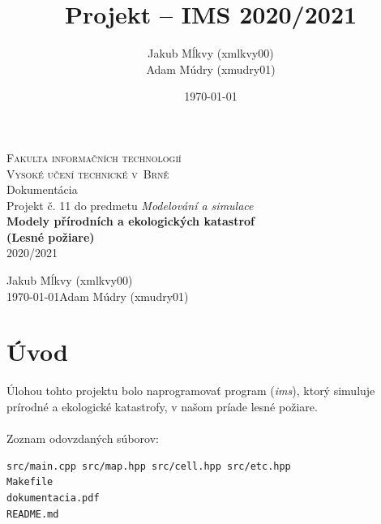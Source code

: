 \documentclass[a4paper,12pt]{article}
\author{Jakub Mĺkvy (xmlkvy00)\\Adam Múdry (xmudry01)}
\date{\today}
\title{\Large\bf Projekt -- IMS 2020/2021}
\begin{document}
\begin{titlepage}
	\begin{center}
	    \vspace*{+3cm}
		\Huge
		\textsc{Fakulta informačních technologií\\
		\huge Vysoké učení technické v~Brně}\\
	    {\LARGE{Dokumentácia\\Projekt č. 11 do predmetu \textit{Modelování a simulace}\\
		 \vspace{4mm}
		 \Huge\textbf{{Modely přírodních a ekologických katastrof\\(Lesné požiare)}}\\
		 \vspace{4mm}
		 2020/2021
		 }}
		 
	\end{center}
	{\Large \hfill Jakub Mĺkvy (xmlkvy00)\\
	\today \hfill Adam Múdry (xmudry01)}
	
	\thispagestyle{empty}
    \setcounter{page}{0}
\end{titlepage}

\newpage

\tableofcontents

\newpage
\section{Úvod}
Úlohou tohto projektu bolo naprogramovať program (\textit{ims}), ktorý simuluje prírodné a ekologické katastrofy, v našom príade lesné požiare.
\\
\\
Zoznam odovzdaných súborov: 
\begin{lstlisting}
src/main.cpp src/map.hpp src/cell.hpp src/etc.hpp
Makefile
dokumentacia.pdf
README.md
\end{lstlisting}
\end{document}
